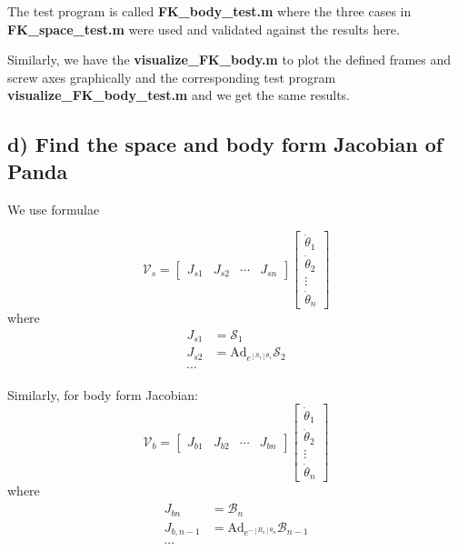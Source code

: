 \documentclass[english,10pt,a4paper]{book}
\begin{document}
    The test program is called \textbf{FK\_body\_test.m} where the three cases in \textbf{FK\_space\_test.m} were used and validated against the results here.
    
    Similarly, we have the \textbf{visualize\_FK\_body.m} to plot the defined frames and screw axes graphically and the corresponding test program \textbf{visualize\_FK\_body\_test.m} and we get the same results.
    
    \subsection*{d) Find the space and body form Jacobian of Panda}
    We use formulae

    $$\mathcal{V}_s = \begin{bmatrix}
    J_{s1} & J_{s2} & \cdots & J_{sn} 
\end{bmatrix}  \begin{bmatrix}
\dot{\theta}_1 \\ \dot{\theta}_2 \\ \vdots \\ \dot{\theta}_n
\end{bmatrix}$$
    where 
\begin{align*}
    J_{s1} &= \mathcal{S}_1 \\
    J_{s2} &= \text{Ad}_{e^{[S_1]\theta_1}} \mathcal{S}_2 \\
    \cdots
\end{align*}

    Similarly, for body form Jacobian:
$$\mathcal{V}_b = \begin{bmatrix}
    J_{b1} & J_{b2} & \cdots & J_{bn} 
\end{bmatrix}  \begin{bmatrix}
    \dot{\theta}_1 \\ \dot{\theta}_2 \\ \vdots \\ \dot{\theta}_n
\end{bmatrix}$$
    where 
\begin{align*}
    J_{bn} &= \mathcal{B}_n \\
    J_{b,{n-1}} &= \text{Ad}_{e^{-[B_n]\theta_n}} \mathcal{B}_{n-1} \\
    \cdots
\end{align*}
	
\end{document}
